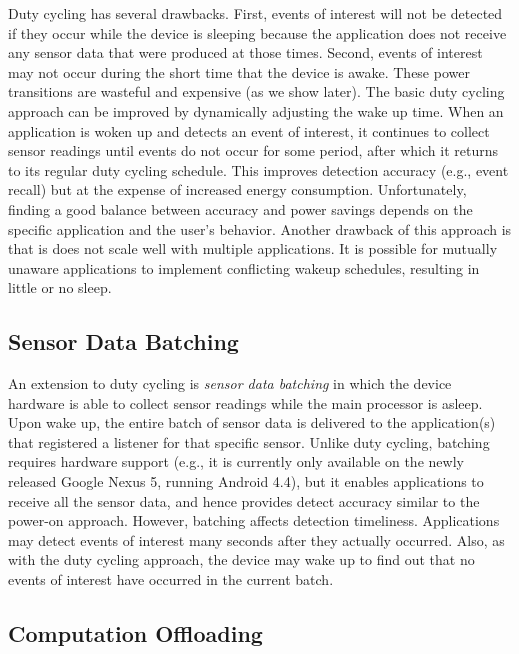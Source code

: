 Duty cycling has several drawbacks. First, events of interest will not be
detected if they occur while the device is sleeping because the application does
not receive any sensor data that were produced at those times. Second, events of
interest may not occur during the short time that the device is awake. These
power transitions are wasteful and expensive (as we show later). The basic duty
cycling approach can be improved by dynamically adjusting the wake up time. When
an application is woken up and detects an event of interest, it continues to
collect sensor readings until events do not occur for some period, after which
it returns to its regular duty cycling schedule. This improves detection
accuracy (e.g., event recall) but at the expense of increased energy
consumption. Unfortunately, finding a good balance between accuracy and power
savings depends on the specific application and the user's behavior. Another
drawback of this approach is that is does not scale well with multiple
applications. It is possible for mutually unaware applications to implement
conflicting wakeup schedules, resulting in little or no sleep.

\subsection{Sensor Data Batching}

An extension to duty cycling is \emph{sensor data batching} in which the device
hardware is able to collect sensor readings while the main processor is
asleep. Upon wake up, the entire batch of sensor data is delivered to the
application(s) that registered a listener for that specific sensor. Unlike duty
cycling, batching requires hardware support (e.g., it is currently only
available on the newly released Google Nexus 5, running Android 4.4), but it
enables applications to receive all the sensor data, and hence provides detect
accuracy similar to the power-on approach. However, batching affects detection
timeliness. Applications may detect events of interest many seconds after they
actually occurred. Also, as with the duty cycling approach, the device may wake
up to find out that no events of interest have occurred in the current batch.

\subsection{Computation Offloading}

